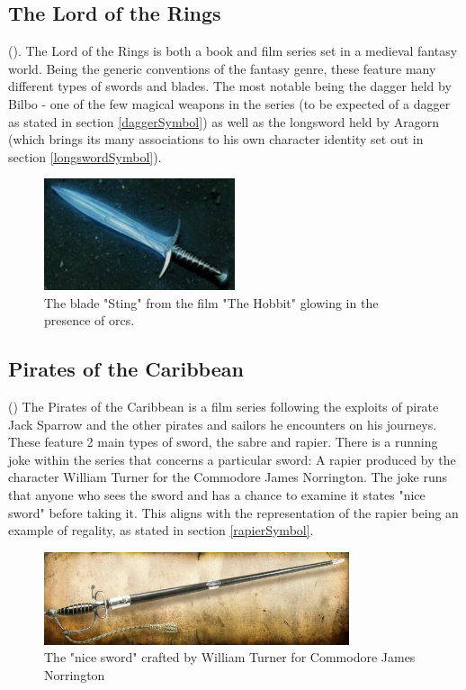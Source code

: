 \documentclass{article}
\begin{document}
\subsection{The Lord of the Rings}

().
The Lord of the Rings is both a book and film series set in a medieval fantasy world. Being the generic conventions of the fantasy genre, these feature many different types of swords and blades. The most notable being the dagger held by Bilbo - one of the few magical weapons in the series (to be expected of a dagger as stated in section \ref{daggerSymbol}) as well as the longsword held by Aragorn (which brings its many associations to his own character identity set out in section \ref{longswordSymbol}).

\begin{figure}[h]
    \centering
    \caption{\parencite{Sting} The blade "Sting" from the film "The Hobbit" glowing in the presence of orcs.}
    \label{fig:Sting}
    \includegraphics[width=0.5\textwidth]{Sting.png}
\end{figure}

\subsection{Pirates of the Caribbean}

()
The Pirates of the Caribbean is a film series following the exploits of pirate Jack Sparrow and the other pirates and sailors he encounters on his journeys. These feature 2 main types of sword, the sabre and rapier. There is a running joke within the series that concerns a particular sword: A rapier produced by the character William Turner for the Commodore James Norrington. The joke runs that anyone who sees the sword and has a chance to examine it states "nice sword" before taking it. This aligns with the representation of the rapier being an example of regality, as stated in section \ref{rapierSymbol}.

\begin{figure}[h]
    \centering
    \includegraphics[width=0.8\textwidth]{Norringtonssword.png}
    \caption{\parencite{potcsword}The "nice sword" crafted by William Turner for Commodore James Norrington}
    \label{fig:potcSword}
\end{figure}
\end{document}

